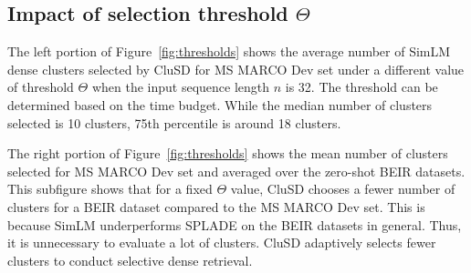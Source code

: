 \subsection{Impact of  selection threshold $\Theta$}
\label{sect:threshold}
The left portion of Figure~\ref{fig:thresholds} shows
the average number of SimLM dense clusters selected by CluSD for MS MARCO Dev set under a different value of threshold $\Theta$ when
the input sequence length $n$ is 32.
The threshold can be determined based on the time budget. 
While the median number of clusters selected is  10 clusters, 75th percentile is around 18 clusters. 

The right portion of Figure~\ref{fig:thresholds} 
shows  the mean number of clusters selected for MS MARCO Dev set and averaged over 
the zero-shot BEIR datasets.
This subfigure shows that for a fixed $\Theta$ value, CluSD  chooses a fewer number of clusters for a
BEIR dataset compared to the MS MARCO Dev set.  
This is because
SimLM underperforms SPLADE on the BEIR datasets in general. Thus, it is unnecessary to evaluate a lot of clusters. 
CluSD adaptively selects fewer clusters to conduct selective dense retrieval.

